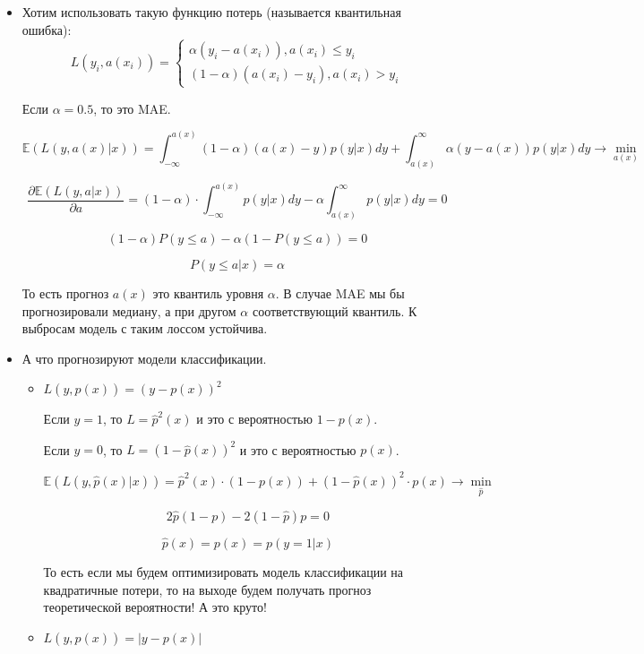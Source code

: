 \documentclass[12pt]{article}
\begin{document}
\begin{itemize}
    \item Хотим использовать такую функцию потерь (называется квантильная ошибка):
    \[ L(y_i, a(x_i)) = \begin{cases}
    
        \alpha (y_i - a(x_i)), a(x_i) \leq y_i \\
        (1 - \alpha) (a(x_i) - y_i), a(x_i) > y_i
    \end{cases} 
    \]

    Если $\alpha = 0.5$, то это MAE.

    \[ \mathbb{E}(L(y, a(x) | x)) = \int_{-\infty}^{a(x)} (1-\alpha) (a(x)-y)p(y|x)dy + \int_{a(x)}^\infty \alpha (y-a(x))p(y|x)dy \rightarrow \min_{a(x)} \]


    \[ \frac{\partial \mathbb{E}(L(y, a | x))}{\partial a} = (1-\alpha) \cdot \int_{-\infty}^{a(x)}p(y|x)dy - \alpha \int_{a(x)}^\infty p(y|x)dy = 0\]

    \[ (1-\alpha) P(y \leq a) - \alpha (1 - P(y \leq a)) = 0 \]

    \[ P(y \leq a | x) = \alpha \]

    То есть прогноз $a(x)$ это квантиль уровня $\alpha$. В случае MAE мы бы прогнозировали медиану, а при другом $\alpha$ соответствующий квантиль.
    К выбросам модель с таким лоссом устойчива.

    \item А что прогнозируют модели классификации.
    
    \begin{itemize}
        \item $L(y, \hat{p}(x)) = (y-p(x))^2$
        
        Если $y=1$, то $L = \hat{p}^2(x)$ и это с вероятностью $1-p(x)$.
    
    Если $y=0$, то $L = (1-\hat{p}(x))^2$ и это с вероятностью $p(x)$.

    \[ \mathbb{E}(L(y, \hat{p}(x) | x)) = \hat{p}^2(x) \cdot (1-p(x)) + (1-\hat{p}(x))^2 \cdot p(x) \rightarrow \min_{\hat{p}} \]

    \[ 2 \hat{p} (1-p) - 2(1-\hat{p})p = 0 \]

    \[ \hat{p}(x) = p(x) = p(y=1|x) \]

    То есть если мы будем оптимизировать модель классификации на квадратичные потери, то на выходе будем получать прогноз теоретической вероятности! А это круто!

        \item $L(y, \hat{p}(x)) = |y-p(x)|$
        

\end{itemize}
\end{itemize}
\end{document}
